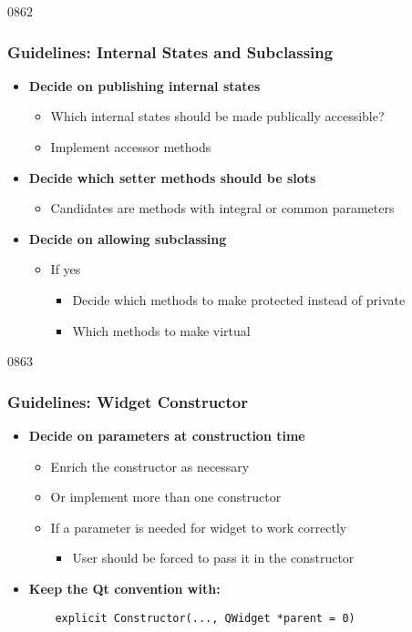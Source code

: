 \begin{slide}{0862}\frametitle{Guidelines: Internal States and Subclassing}
\begin{itemize}
  \item \textbf{Decide on publishing internal states}
    \begin{itemize}
    \item Which internal states should be made publically accessible?
    \item Implement accessor methods
    \end{itemize}
 \item \textbf{Decide which setter methods should be slots}
   \begin{itemize}
   \item Candidates are methods with integral or common parameters
   \end{itemize}
  \item \textbf{Decide on allowing subclassing}
    \begin{itemize}
    \item If yes
      \begin{itemize}
      \item Decide which methods to make protected instead of private
      \item Which methods to make virtual
     \end{itemize}
    \end{itemize}
  \end{itemize}
\end{slide}
\begin{slide}[fragile]{0863}\frametitle{Guidelines: Widget Constructor}
\begin{itemize}
\item \textbf{Decide on parameters at construction time}
  \begin{itemize}
  \item Enrich the constructor as necessary
  \item Or implement more than one constructor
  \item If a parameter is needed for widget to work correctly
    \begin{itemize}
    \item User should be forced to pass it in the constructor
    \end{itemize}
  \end{itemize}
  \item \textbf{Keep the Qt convention with:}
\begin{lstlisting}
    explicit Constructor(..., QWidget *parent = 0)
\end{lstlisting}
  \end{itemize}
\end{slide}


